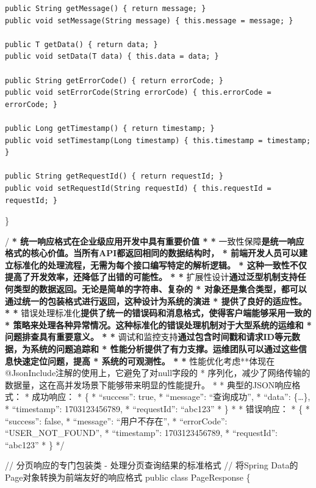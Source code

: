 \begin{verbatim}
public String getMessage() { return message; }
public void setMessage(String message) { this.message = message; }

public T getData() { return data; }
public void setData(T data) { this.data = data; }

public String getErrorCode() { return errorCode; }
public void setErrorCode(String errorCode) { this.errorCode = errorCode; }

public Long getTimestamp() { return timestamp; }
public void setTimestamp(Long timestamp) { this.timestamp = timestamp; }

public String getRequestId() { return requestId; }
public void setRequestId(String requestId) { this.requestId = requestId; }
\end{verbatim}

\}

/\textbf{ * 统一响应格式在企业级应用开发中具有重要价值 * * }一致性保障\textbf{是统一响应格式的核心价值。当所有API都返回相同的数据结构时， * 前端开发人员可以建立标准化的处理流程，无需为每个接口编写特定的解析逻辑。 * 这种一致性不仅提高了开发效率，还降低了出错的可能性。 * * }扩展性设计\textbf{通过泛型机制支持任何类型的数据返回。无论是简单的字符串、复杂的 * 对象还是集合类型，都可以通过统一的包装格式进行返回，这种设计为系统的演进 * 提供了良好的适应性。 * * }错误处理标准化\textbf{提供了统一的错误码和消息格式，使得客户端能够采用一致的 * 策略来处理各种异常情况。这种标准化的错误处理机制对于大型系统的运维和 * 问题排查具有重要意义。 * * }调试和监控支持\textbf{通过包含时间戳和请求ID等元数据，为系统的问题追踪和 * 性能分析提供了有力支撑。运维团队可以通过这些信息快速定位问题，提高 * 系统的可观测性。 * * }性能优化考虑**体现在@JsonInclude注解的使用上，它避免了对null字段的 * 序列化，减少了网络传输的数据量，这在高并发场景下能够带来明显的性能提升。 * * 典型的JSON响应格式： * 成功响应： * \{ * ``success'': true, * ``message'': ``查询成功'', * ``data'': \{\ldots\}, * ``timestamp'': 1703123456789, * ``requestId'': ``abc123'' * \} * * 错误响应： * \{ * ``success'': false, * ``message'': ``用户不存在'', * ``errorCode'': ``USER\_NOT\_FOUND'', * ``timestamp'': 1703123456789, * ``requestId'': ``abc123'' * \} */

// 分页响应的专门包装类 - 处理分页查询结果的标准格式 // 将Spring Data的Page对象转换为前端友好的响应格式 public class PageResponse \{

